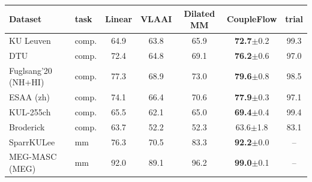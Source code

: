 \begin{tabular}{llccc|cc}\toprule
Dataset & task & Linear & VLAAI & Dilated MM & CoupleFlow & trial \\\midrule
KU Leuven & comp. & 64.9 & 63.8 & 65.9 & \textbf{72.7}{\scriptsize$\pm$0.2} & 99.3 \\
DTU & comp. & 72.4 & 64.8 & 69.1 & \textbf{76.2}{\scriptsize$\pm$0.6} & 97.0 \\
Fuglsang'20 (NH+HI) & comp. & 77.3 & 68.9 & 73.0 & \textbf{79.6}{\scriptsize$\pm$0.8} & 98.5 \\
ESAA (zh) & comp. & 74.1 & 66.4 & 70.6 & \textbf{77.9}{\scriptsize$\pm$0.3} & 97.1 \\
KUL-255ch & comp. & 65.5 & 62.1 & 65.0 & \textbf{69.4}{\scriptsize$\pm$0.4} & 99.4 \\
Broderick & comp. & 63.7 & 52.2 & 52.3 & 63.6{\scriptsize$\pm$1.8} & 83.1 \\
\midrule
SparrKULee & mm & 76.3 & 70.5 & 83.3 & \textbf{92.2}{\scriptsize$\pm$0.0} & -- \\
MEG-MASC (MEG) & mm & 92.0 & 89.1 & 96.2 & \textbf{99.0}{\scriptsize$\pm$0.1} & -- \\
\bottomrule\end{tabular}
